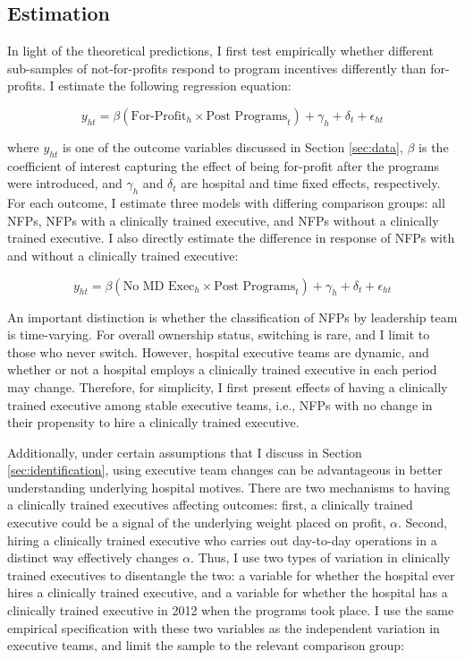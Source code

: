 \documentclass[12pt]{article}
\begin{document}
    \subsection{Estimation}

    In light of the theoretical predictions, I first test empirically whether different sub-samples of not-for-profits respond to program incentives differently than for-profits. I estimate the following regression equation:

    \begin{equation}
    \label{eq:forprofit}
    y_{ht} = \beta (\text{For-Profit}_h \times \text{Post Programs}_t) + \gamma_{h} + \delta_t + \epsilon_{ht}
    \end{equation}

    \noindent where $y_{ht}$ is one of the outcome variables discussed in Section \ref{sec:data}, $\beta$ is the coefficient of interest capturing the effect of being for-profit after the programs were introduced, and $\gamma_h$ and $\delta_t$ are hospital and time fixed effects, respectively. For each outcome, I estimate three models with differing comparison groups: all NFPs, NFPs with a clinically trained executive, and NFPs without a clinically trained executive. I also directly estimate the difference in response of NFPs with and without a clinically trained executive:

    \begin{equation}
    \label{eq:clinical}
    y_{ht} = \beta (\text{No MD Exec}_h \times \text{Post Programs}_t) + \gamma_{h} + \delta_t + \epsilon_{ht}
    \end{equation}

    An important distinction is whether the classification of NFPs by leadership team is time-varying. For overall ownership status, switching is rare, and I limit to those who never switch. However, hospital executive teams are dynamic, and whether or not a hospital employs a clinically trained executive in each period may change. Therefore, for simplicity, I first present effects of having a clinically trained executive among stable executive teams, i.e., NFPs with no change in their propensity to hire a clinically trained executive. 

    Additionally, under certain assumptions that I discuss in Section \ref{sec:identification}, using executive team changes can be advantageous in better understanding underlying hospital motives. There are two mechanisms to having a clinically trained executives affecting outcomes: first, a clinically trained executive could be a signal of the underlying weight placed on profit, $\alpha$. Second, hiring a clinically trained executive who carries out day-to-day operations in a distinct way effectively changes $\alpha$. Thus, I use two types of variation in clinically trained executives to disentangle the two: a variable for whether the hospital ever hires a clinically trained executive, and a variable for whether the hospital has a clinically trained executive in 2012 when the programs took place. I use the same empirical specification with these two variables as the independent variation in executive teams, and limit the sample to the relevant comparison group: 
\end{document}

